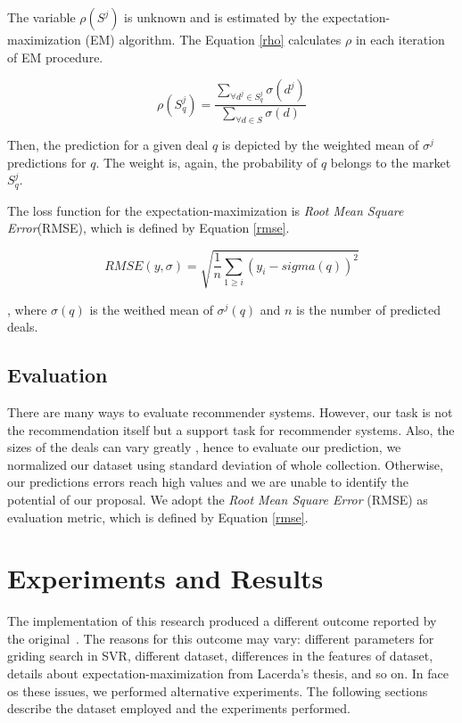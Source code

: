 \documentclass{acm_proc_article-sp}
\begin{document}
The variable $\rho(S^j)$ is unknown and is estimated by the  
expectation-maximization (EM) algorithm. The Equation \ref{rho} calculates $\rho$ 
in each iteration of EM procedure.

\begin{equation}
    \rho(S^j_q) = \frac{\sum_{\forall d^j \in S^j_q} \sigma(d^j)}{\sum_{\forall d \in S} \sigma(d)}
    \label{rho}
\end{equation}

Then, the prediction for a given deal $q$ is depicted by the weighted mean 
of $\sigma^j$ predictions for $q$. The weight is, again, the probability of $q$ 
belongs to the market $S^j_q$.

The loss function for the expectation-maximization is 
\emph{Root Mean Square Error}(RMSE), which is defined by Equation 
\ref{rmse}.

\begin{equation}
    RMSE(y,\sigma) = \sqrt{\frac{1}{n}\sum_{1\geq i}(y_i - sigma(q))^2}
    \label{rmse}
\end{equation}

, where $\sigma(q)$ is the weithed mean of $\sigma^j(q)$ and $n$ is the number 
of predicted deals.

\subsection{Evaluation}

There are many ways to evaluate recommender systems. However, our task 
is not the recommendation itself but a support task for 
recommender systems. Also, the sizes of the deals can vary greatly  
, hence to evaluate our 
prediction, we normalized our dataset using standard deviation of 
whole collection. Otherwise, 
our predictions errors reach high values and we are unable to 
identify the potential of our proposal. 
We adopt the 
\emph{Root Mean Square Error} (RMSE)  as evaluation metric, which is 
defined by Equation \ref{rmse}. 



\section{Experiments and Results}

The implementation of this research produced a different outcome reported  
by the original~\cite{lacerda2014context}. The reasons for this outcome 
may vary: different parameters for griding search in SVR, different dataset, 
differences in the features of dataset, 
details about expectation-maximization from Lacerda's thesis, and so on.
In face os these issues, we performed alternative experiments. The following 
sections describe the dataset employed and the experiments performed.
\end{document}
